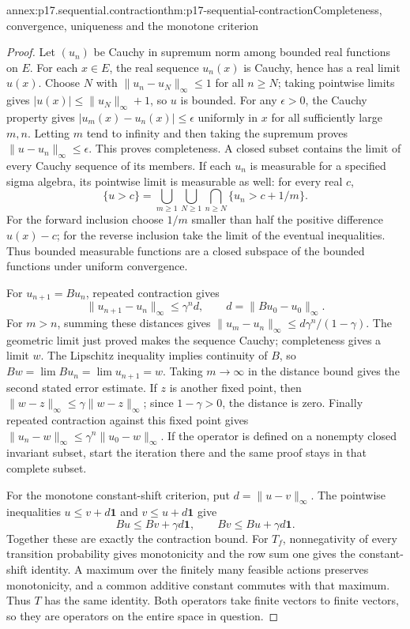 \begin{annexitem}{annex:p17.sequential.contraction}{thm:p17-sequential-contraction}{Completeness, convergence, uniqueness and the monotone criterion}
\begin{proof}
Let \((u_n)\) be Cauchy in supremum norm among bounded
real functions on \(E\).
For each \(x\in E\), the real sequence \(u_n(x)\)
is Cauchy, hence has a real limit \(u(x)\).
Choose \(N\) with \(\|u_n-u_N\|_\infty\leq1\)
for all \(n\geq N\); taking pointwise limits gives
\(|u(x)|\leq\|u_N\|_\infty+1\), so \(u\) is bounded.
For any \(\epsilon>0\), the Cauchy property gives
\(|u_m(x)-u_n(x)|\leq\epsilon\) uniformly in \(x\)
for all sufficiently large \(m,n\).
Letting \(m\) tend to infinity and then taking the
supremum proves \(\|u-u_n\|_\infty\leq\epsilon\).
This proves completeness. A closed subset contains
the limit of every Cauchy sequence of its members.
If each \(u_n\) is measurable for a specified sigma algebra,
its pointwise limit is measurable as well: for every real \(c\),
\[
 \{u>c\}=\bigcup_{m\geq1}\bigcup_{N\geq1}
                    \bigcap_{n\geq N}\{u_n>c+1/m\}.
\]
For the forward inclusion choose \(1/m\) smaller than half
the positive difference \(u(x)-c\); for the reverse inclusion
take the limit of the eventual inequalities.
Thus bounded measurable functions are a closed subspace
of the bounded functions under uniform convergence.

For \(u_{n+1}=Bu_n\), repeated contraction gives
\[
 \|u_{n+1}-u_n\|_\infty
       \leq\gamma^n d,\qquad d=\|Bu_0-u_0\|_\infty .
\]
For \(m>n\), summing these distances gives
\(\|u_m-u_n\|_\infty\leq d\gamma^n/(1-\gamma)\).
The geometric limit just proved makes the sequence
Cauchy; completeness gives a limit \(w\).
The Lipschitz inequality implies continuity of \(B\),
so \(Bw=\lim Bu_n=\lim u_{n+1}=w\).
Taking \(m\to\infty\) in the distance bound gives
the second stated error estimate.
If \(z\) is another fixed point, then
\(\|w-z\|_\infty\leq\gamma\|w-z\|_\infty\);
since \(1-\gamma>0\), the distance is zero.
Finally repeated contraction against this fixed point
gives \(\|u_n-w\|_\infty\leq\gamma^n\|u_0-w\|_\infty\).
If the operator is defined on a nonempty closed
invariant subset, start the iteration there and the
same proof stays in that complete subset.

For the monotone constant-shift criterion, put
\(d=\|u-v\|_\infty\). The pointwise inequalities
\(u\leq v+d\mathbf1\) and \(v\leq u+d\mathbf1\)
give
\[
                   Bu\leq Bv+\gamma d\mathbf1,\qquad
                   Bv\leq Bu+\gamma d\mathbf1.
\]
Together these are exactly the contraction bound.
For \(T_f\), nonnegativity of every transition probability
gives monotonicity and the row sum one gives the
constant-shift identity. A maximum over the finitely
many feasible actions preserves monotonicity, and a
common additive constant commutes with that maximum.
Thus \(T\) has the same identity.
Both operators take finite vectors to finite vectors,
so they are operators on the entire space in question.
\end{proof}
\end{annexitem}

